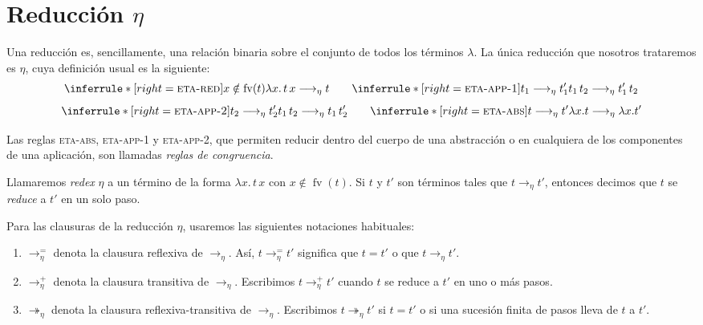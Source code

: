 \documentclass[
  spanish,
  letterpaper,
  DIV=11,
  numbers=noendperiod]{scrreprt}
\theoremstyle{remark}
\begin{document}

\chapter{\texorpdfstring{Reducción
\(\eta\)}{Reducción \textbackslash eta}}\label{reducciuxf3n-eta}

Una reducción es, sencillamente, una relación binaria sobre el conjunto
de todos los términos \(\lambda\). La única reducción que nosotros
trataremos es \(\eta\), cuya definición usual es la siguiente: \[
\inferrule*[right=\textsc{eta-red}]
  {x \notin \operatorname{fv}(t)}
  {\lambda x. \, t \, x
   \longrightarrow_{\eta} t}
\qquad
\inferrule*[right=\textsc{eta-app-1}]
  {t_1 \longrightarrow_{\eta} t_1'}
  {t_1 \, t_2
   \longrightarrow_{\eta}
   t_1' \, t_2}
\] \[
\inferrule*[right=\textsc{eta-app-2}]
  {t_2 \longrightarrow_{\eta} t_2'}
  {t_1 \, t_2
   \longrightarrow_{\eta}
   t_1 \, t_2'}
\qquad
\inferrule*[right=\textsc{eta-abs}]
  {t \longrightarrow_{\eta} t'}
  {\lambda x. t
   \longrightarrow_{\eta}
   \lambda x. t'}
\]

Las reglas \textsc{eta-abs}, \textsc{eta-app-1} y \textsc{eta-app-2},
que permiten reducir dentro del cuerpo de una abstracción o en
cualquiera de los componentes de una aplicación, son llamadas
\emph{reglas de congruencia}.

Llamaremos \emph{redex} \(\eta\) a un término de la forma
\(\lambda x.\,t\,x\) con \(x\notin\operatorname{fv}(t)\). Si \(t\) y
\(t'\) son términos tales que \(t \longrightarrow_{\eta} t'\), entonces
decimos que \(t\) se \emph{reduce} a \(t'\) en un solo paso.

Para las clausuras de la reducción \(\eta\), usaremos las siguientes
notaciones habituales:

\begin{enumerate}
\def\labelenumi{\arabic{enumi}.}
\item
  \(\longrightarrow_{\eta}^{=}\) denota la clausura reflexiva de
  \(\longrightarrow_\eta\). Así, \(t \longrightarrow_{\eta}^{=} t'\)
  significa que \(t=t'\) o que \(t \longrightarrow_\eta t'\).
\item
  \(\longrightarrow_{\eta}^{+}\) denota la clausura transitiva de
  \(\longrightarrow_\eta\). Escribimos
  \(t \longrightarrow_{\eta}^{+} t'\) cuando \(t\) se reduce a \(t'\) en
  uno o más pasos.
\item
  \(\twoheadrightarrow_{\eta}\) denota la clausura reflexiva-transitiva
  de \(\longrightarrow_\eta\). Escribimos
  \(t \twoheadrightarrow_\eta t'\) si \(t=t'\) o si una sucesión finita
  de pasos lleva de \(t\) a \(t'\).
\end{enumerate}
\end{document}

